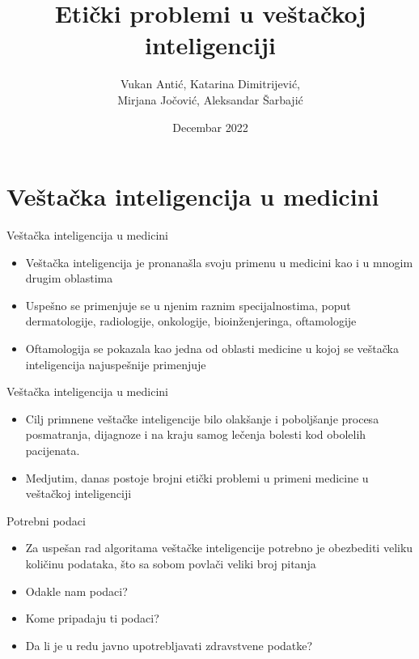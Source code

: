 \documentclass[14pt, aspectratio=169]{beamer}
\title{Etički problemi u veštačkoj inteligenciji}
\author{Vukan Antić, Katarina Dimitrijević, \\ Mirjana Jočović, Aleksandar Šarbajić}
\date{Decembar 2022}
\begin{document}
\maketitle

\section{Veštačka inteligencija u medicini}

\begin{frame}{Veštačka inteligencija u medicini}
    \begin{itemize}
        \item Veštačka inteligencija je pronanašla svoju primenu u medicini kao i u mnogim drugim oblastima
    \end{itemize}
    \begin{itemize}
        \item Uspešno se primenjuje se u njenim raznim specijalnostima, poput dermatologije, radiologije, onkologije, bioinženjeringa, oftamologije
    \end{itemize}
    \begin{itemize}
        \item Oftamologija se pokazala kao jedna od oblasti medicine u kojoj se veštačka inteligencija najuspešnije primenjuje
    \end{itemize}
\end{frame}

\begin{frame}{Veštačka inteligencija u medicini}
    \begin{itemize}
        \item Cilj primnene veštačke inteligencije bilo olakšanje i poboljšanje procesa  posmatranja, dijagnoze i na kraju samog lečenja bolesti kod obolelih pacijenata.
    \end{itemize}
    \begin{itemize}
        \item Medjutim, danas postoje brojni etički problemi u primeni medicine u veštačkoj inteligenciji
    \end{itemize}
\end{frame}

\begin{frame}{Potrebni podaci}
    \begin{itemize}
        \item Za uspešan rad algoritama veštačke inteligencije potrebno je obezbediti veliku količinu podataka, što sa sobom povlači veliki broj pitanja
    \end{itemize}
    \begin{itemize}
        \item Odakle nam podaci?
        \item Kome pripadaju ti podaci?
        \item Da li je u redu javno upotrebljavati zdravstvene podatke?
    \end{itemize}
\end{frame}
\end{document}
